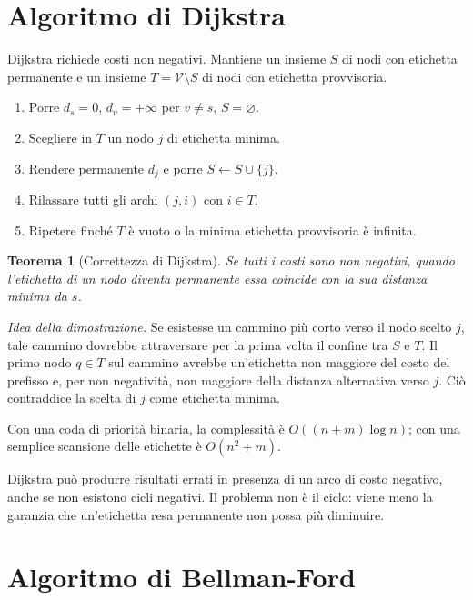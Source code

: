 \documentclass[11pt,a4paper]{article}
\newtheorem{theorem}[definition]{Teorema}
\newcommand{\V}{\mathcal{V}}
\begin{document}
\section{Algoritmo di Dijkstra}

Dijkstra richiede costi non negativi. Mantiene un insieme $S$ di nodi con etichetta permanente e un insieme $T=\V\setminus S$ di nodi con etichetta provvisoria.

\begin{enumerate}
\item Porre $d_s=0$, $d_v=+\infty$ per $v\neq s$, $S=\varnothing$.
\item Scegliere in $T$ un nodo $j$ di etichetta minima.
\item Rendere permanente $d_j$ e porre $S\leftarrow S\cup\{j\}$.
\item Rilassare tutti gli archi $(j,i)$ con $i\in T$.
\item Ripetere finché $T$ è vuoto o la minima etichetta provvisoria è infinita.
\end{enumerate}

\begin{theorem}[Correttezza di Dijkstra]
Se tutti i costi sono non negativi, quando l'etichetta di un nodo diventa permanente essa coincide con la sua distanza minima da $s$.
\end{theorem}

\emph{Idea della dimostrazione.} Se esistesse un cammino più corto verso il nodo scelto $j$, tale cammino dovrebbe attraversare per la prima volta il confine tra $S$ e $T$. Il primo nodo $q\in T$ sul cammino avrebbe un'etichetta non maggiore del costo del prefisso e, per non negatività, non maggiore della distanza alternativa verso $j$. Ciò contraddice la scelta di $j$ come etichetta minima.

Con una coda di priorità binaria, la complessità è $O((n+m)\log n)$; con una semplice scansione delle etichette è $O(n^2+m)$.

\begin{warningbox}
Dijkstra può produrre risultati errati in presenza di un arco di costo negativo, anche se non esistono cicli negativi. Il problema non è il ciclo: viene meno la garanzia che un'etichetta resa permanente non possa più diminuire.
\end{warningbox}

\section{Algoritmo di Bellman-Ford}
\end{document}
